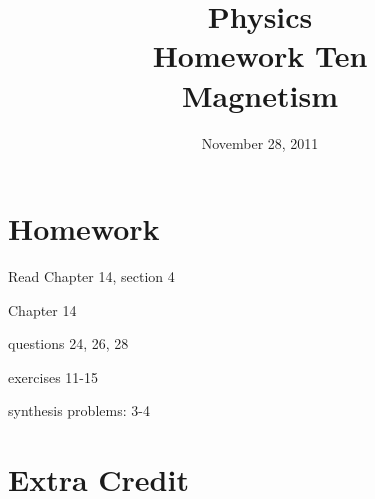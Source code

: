 \documentclass{exam}
\title{Physics \\ Homework Ten \\ Magnetism}
\date{November 28, 2011}
\begin{document}
\maketitle

\section{Homework}

\begin{itemize*}
  \item Read Chapter 14, section 4
  \item Chapter 14
    \begin{itemize*}
      \item questions 24, 26, 28
      \item exercises 11-15
      \item synthesis problems: 3-4
    \end{itemize*}
\end{itemize*}

\section{Extra Credit}
\end{document}
